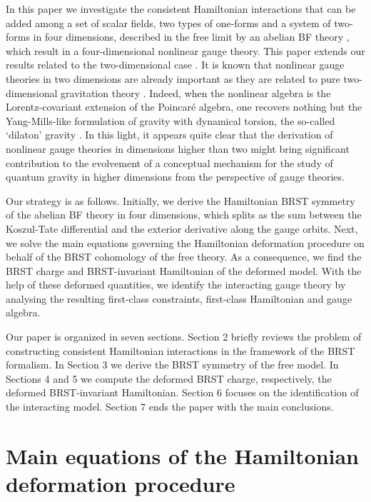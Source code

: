 \documentclass[a4paper,12pt]{article}
\begin{document}
In this paper we investigate the consistent Hamiltonian interactions that
can be added among a set of scalar fields, two types of one-forms and a
system of two-forms in four dimensions, described in the free limit by an
abelian BF theory \cite{13}, which result in a four-dimensional nonlinear
gauge theory. This paper extends our results related to the two-dimensional
case \cite{mpla}. It is known that nonlinear gauge theories in two
dimensions \cite{14} are already important as they are related to pure
two-dimensional gravitation theory \cite{15}. Indeed, when the nonlinear
algebra is the Lorentz-covariant extension of the Poincar\'{e} algebra, one
recovers nothing but the Yang-Mills-like formulation of \coordHE{}
gravity with dynamical torsion, the so-called `dilaton' gravity \cite{16}.
In this light, it appears quite clear that the derivation of nonlinear gauge
theories in dimensions higher than two might bring significant contribution
to the evolvement of a conceptual mechanism for the study of quantum gravity
in higher dimensions from the perspective of gauge theories.

Our strategy is as follows. Initially, we derive the Hamiltonian BRST
symmetry of the abelian BF theory in four dimensions, which splits as the
sum between the Koszul-Tate differential and the exterior derivative along
the gauge orbits. Next, we solve the main equations governing the
Hamiltonian deformation procedure on behalf of the BRST cohomology of the
free theory. As a consequence, we find the BRST charge and BRST-invariant
Hamiltonian of the deformed model. With the help of these deformed
quantities, we identify the interacting gauge theory by analysing the
resulting first-class constraints, first-class Hamiltonian and gauge algebra.

Our paper is organized in seven sections. Section 2 briefly reviews the
problem of constructing consistent Hamiltonian interactions in the framework
of the BRST formalism. In Section 3 we derive the BRST symmetry of the free
model. In Sections 4 and 5 we compute the deformed BRST charge,
respectively, the deformed BRST-invariant Hamiltonian. Section 6 focuses on
the identification of the interacting model. Section 7 ends the paper with
the main conclusions.

\section{Main equations of the Hamiltonian deformation procedure}
\end{document}
